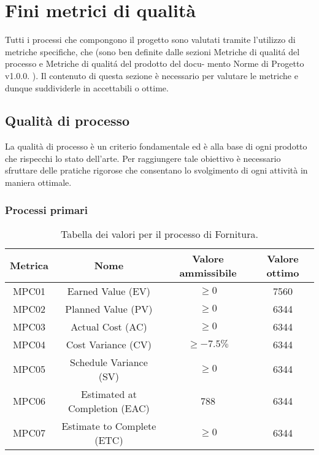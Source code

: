 \documentclass[italian,12pt]{article} %
\begin{document}
\section{Fini metrici di qualità}
Tutti i processi che compongono il progetto sono valutati tramite l'utilizzo 
di metriche specifiche, che (sono ben definite dalle sezioni Metriche di qualitá del processo e Metriche di qualitá del prodotto del docu-
mento Norme di Progetto v1.0.0. ).
Il contenuto di questa sezione è necessario per valutare le metriche e 
dunque suddividerle in accettabili o ottime.

\subsection{Qualità di processo}
La qualità di processo è un criterio fondamentale ed è alla base di ogni prodotto
che rispecchi lo stato dell'arte. Per raggiungere tale obiettivo è necessario 
sfruttare delle pratiche rigorose che consentano lo svolgimento di ogni attività
in maniera ottimale.

\subsubsection{Processi primari}


\begin{table}[h!]
	\centering
	\begin{tabular}{|c|c|c|c|} 
	 \hline
	 Metrica & Nome & Valore ammissibile & Valore ottimo \\  
	 \hline
	 MPC01 & Earned Value (EV) & $\geq 0$ & 7560 \\
	 \hline
	 MPC02 & Planned Value (PV) & $\geq 0$ & 6344 \\ 
	 \hline
	 MPC03 & Actual Cost (AC) & $\geq 0$ & 6344 \\ 
	 \hline
	 MPC04 & Cost Variance (CV) & $\geq -7.5\%$ & 6344 \\ 
	 \hline
	 MPC05 & Schedule Variance (SV) & $\geq 0$ & 6344 \\ 
	 \hline
	 MPC06 & Estimated at Completion (EAC) & 788 & 6344 \\ 
	 \hline
	 MPC07 & Estimate to Complete (ETC)  & $\geq 0$ & 6344 \\ 
	 \hline
	\end{tabular}
	\caption{Tabella dei valori per il processo di Fornitura.}
	\label{table:1}
	\end{table}
\end{document}

